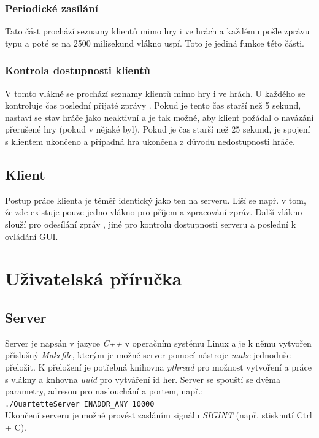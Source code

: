 \documentclass[12pt, a4paper]{article}
\begin{document}
			\subsubsection{Periodické zasílání }
			Tato část prochází seznamy klientů mimo hry i ve hrách a každému pošle zprávu typu a poté se na 2500 milisekund vlákno uspí. Toto je jediná funkce této části.
			
			\subsubsection{Kontrola dostupnosti klientů}
			V tomto vlákně se prochází seznamy klientů mimo hry i ve hrách. U každého se kontroluje čas poslední přijaté zprávy . Pokud je tento čas starší než 5 sekund, nastaví se stav hráče jako neaktivní a je tak možné, aby klient požádal o navázání přerušené hry (pokud v nějaké byl). Pokud je čas starší než 25 sekund, je spojení s klientem ukončeno a případná hra ukončena z důvodu nedostupnosti hráče.
		
		\subsection{Klient}
		Postup práce klienta je téměř identický jako ten na serveru. Liší se např. v tom, že zde existuje pouze jedno vlákno pro příjem a zpracování zpráv. Další vlákno slouží pro odesílání zpráv , jiné pro kontrolu dostupnosti serveru a poslední k ovládání GUI.
		
	\section{Uživatelská příručka}
		\subsection{Server}
		Server je napsán v jazyce \emph{C++} v operačním systému Linux a je k němu vytvořen příslušný \emph{Makefile}, kterým je možné server pomocí nástroje \emph{make} jednoduše přeložit. K přeložení je potřebná knihovna \emph{pthread} pro možnost vytvoření a práce s vlákny a knhovna \emph{uuid} pro vytváření id her. Server se spouští se dvěma parametry, adresou pro naslouchání a portem, např.:\\
		\texttt{./QuartetteServer INADDR\_ANY 10000}\\
		Ukončení serveru je možné provést zasláním signálu \emph{SIGINT} (např. stisknutí Ctrl + C).
	
\end{document}
